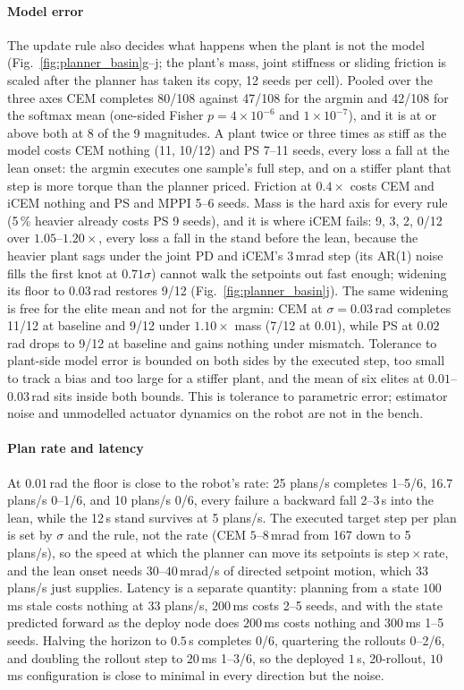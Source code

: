 \paragraph{Model error} The update rule also decides what happens when the
plant is not the model (Fig.~\ref{fig:planner_basin}g--j; the plant's mass,
joint stiffness or sliding friction is scaled after the planner has taken
its copy, 12 seeds per cell). Pooled over the three axes CEM completes
80/108 against 47/108 for the argmin and 42/108 for the softmax mean
(one-sided Fisher $p=4\times10^{-6}$ and $1\times10^{-7}$), and it is at or
above both at 8 of the 9 magnitudes. A plant twice or three times as stiff
as the model costs CEM nothing (11, 10/12) and PS 7--11 seeds, every loss a
fall at the lean onset: the argmin executes one sample's full step, and on a
stiffer plant that step is more torque than the planner priced. Friction at
$0.4\times$ costs CEM and iCEM nothing and PS and MPPI 5--6 seeds. Mass is the
hard axis for every rule (5\,\% heavier already costs PS 9 seeds), and it is
where iCEM fails: 9, 3, 2, 0/12 over $1.05$--$1.20\times$, every loss a fall in
the stand before the lean, because the heavier plant sags under the joint PD
and iCEM's $3$\,mrad step (its AR(1) noise fills the first knot at
$0.71\sigma$) cannot walk the setpoints out fast enough; widening its floor to
$0.03$\,rad restores 9/12 (Fig.~\ref{fig:planner_basin}j). The same widening is free for the elite mean and
not for the argmin: CEM at $\sigma=0.03$\,rad completes 11/12 at baseline and
9/12 under $1.10\times$ mass (7/12 at $0.01$), while PS at $0.02$\,rad drops to
9/12 at baseline and gains nothing under mismatch. Tolerance to plant-side
model error is bounded on both sides by the executed step, too small to track
a bias and too large for a stiffer plant, and the mean of six elites at
$0.01$--$0.03$\,rad sits inside both bounds. This is tolerance to parametric
error; estimator noise and unmodelled actuator dynamics on the robot are not
in the bench.

\paragraph{Plan rate and latency} %
At $0.01$\,rad the floor is close to the robot's rate: 25 plans/s completes
1--5/6, 16.7 plans/s 0--1/6, and 10 plans/s 0/6, every failure a backward
fall 2--3\,s into the lean, while the 12\,s stand survives at 5 plans/s. The
executed target step per plan is set by $\sigma$ and the rule, not the rate
(CEM $5$--$8$\,mrad from 167 down to 5 plans/s), so the speed at which the
planner can move its setpoints is step\,$\times$\,rate, and the lean onset
needs $30$--$40$\,mrad/s of directed setpoint motion, which 33 plans/s just
supplies. Latency is a separate quantity: planning
from a state $100$\,ms stale costs nothing at 33 plans/s, $200$\,ms costs
2--5 seeds, and with the state predicted forward as the deploy node does
$200$\,ms costs nothing and $300$\,ms 1--5 seeds. Halving the horizon to
$0.5$\,s completes 0/6, quartering the rollouts 0--2/6, and doubling the
rollout step to $20$\,ms 1--3/6, so the deployed $1$\,s, 20-rollout, $10$\,ms
configuration is close to minimal in every direction but the noise.

